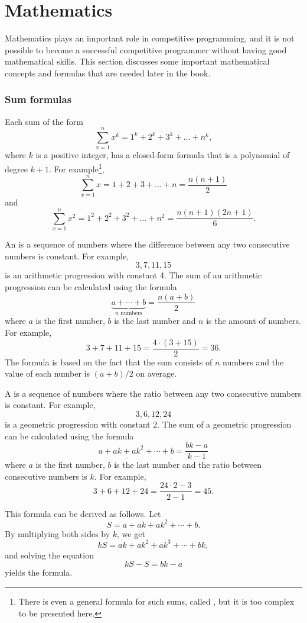\section{Mathematics}

Mathematics plays an important role in competitive
programming, and it is not possible to become
a successful competitive programmer without
having good mathematical skills.
This section discusses some important
mathematical concepts and formulas that
are needed later in the book.

\subsubsection{Sum formulas}

Each sum of the form
\[\sum_{x=1}^n x^k = 1^k+2^k+3^k+\ldots+n^k,\]
where $k$ is a positive integer,
has a closed-form formula that is a
polynomial of degree $k+1$.
For example\footnote{
There is even a general formula for such sums, called ,
but it is too complex to be presented here.},
\[\sum_{x=1}^n x = 1+2+3+\ldots+n = \frac{n(n+1)}{2}\]
and
\[\sum_{x=1}^n x^2 = 1^2+2^2+3^2+\ldots+n^2 = \frac{n(n+1)(2n+1)}{6}.\]

An  is a 
sequence of numbers
where the difference between any two consecutive
numbers is constant.
For example,
\[3, 7, 11, 15\]
is an arithmetic progression with constant 4.
The sum of an arithmetic progression can be calculated
using the formula
\[\underbrace{a + \cdots + b}_{n \,\, \textrm{numbers}} = \frac{n(a+b)}{2}\]
where $a$ is the first number,
$b$ is the last number and
$n$ is the amount of numbers.
For example,
\[3+7+11+15=\frac{4 \cdot (3+15)}{2} = 36.\]
The formula is based on the fact
that the sum consists of $n$ numbers and
the value of each number is $(a+b)/2$ on average.

A  is a sequence
of numbers
where the ratio between any two consecutive
numbers is constant.
For example,
\[3,6,12,24\]
is a geometric progression with constant 2.
The sum of a geometric progression can be calculated
using the formula
\[a + ak + ak^2 + \cdots + b = \frac{bk-a}{k-1}\]
where $a$ is the first number,
$b$ is the last number and the
ratio between consecutive numbers is $k$.
For example,
\[3+6+12+24=\frac{24 \cdot 2 - 3}{2-1} = 45.\]

This formula can be derived as follows. Let
\[ S = a + ak + ak^2 + \cdots + b .\]
By multiplying both sides by $k$, we get
\[ kS = ak + ak^2 + ak^3 + \cdots + bk,\]
and solving the equation
\[ kS-S = bk-a\]
yields the formula.

